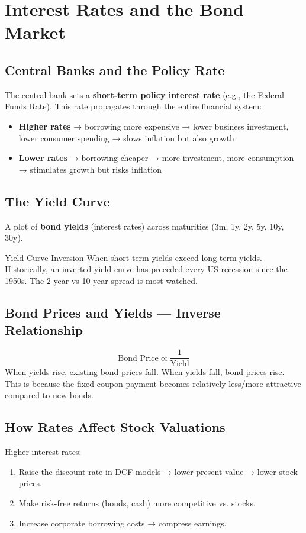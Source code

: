 \section{Interest Rates and the Bond Market}

\subsection{Central Banks and the Policy Rate}
The central bank sets a \textbf{short-term policy interest rate} (e.g., the Federal Funds Rate).
This rate propagates through the entire financial system:

\begin{itemize}
  \item \textbf{Higher rates} → borrowing more expensive → lower business investment, lower
        consumer spending → slows inflation but also growth
  \item \textbf{Lower rates} → borrowing cheaper → more investment, more consumption →
        stimulates growth but risks inflation
\end{itemize}

\subsection{The Yield Curve}
A plot of \textbf{bond yields} (interest rates) across maturities (3m, 1y, 2y, 5y, 10y, 30y).

\begin{keyterm}{Yield Curve Inversion}
When short-term yields exceed long-term yields. Historically, an inverted yield curve
has preceded every US recession since the 1950s. The 2-year vs 10-year spread is most watched.
\end{keyterm}

\subsection{Bond Prices and Yields — Inverse Relationship}

\begin{formulabox}
\[
  \text{Bond Price} \propto \frac{1}{\text{Yield}}
\]
When yields rise, existing bond prices fall. When yields fall, bond prices rise.
This is because the fixed coupon payment becomes relatively less/more attractive
compared to new bonds.
\end{formulabox}

\subsection{How Rates Affect Stock Valuations}
Higher interest rates:
\begin{enumerate}[label=\arabic*.]
  \item Raise the discount rate in DCF models → lower present value → lower stock prices.
  \item Make risk-free returns (bonds, cash) more competitive vs. stocks.
  \item Increase corporate borrowing costs → compress earnings.
\end{enumerate}

